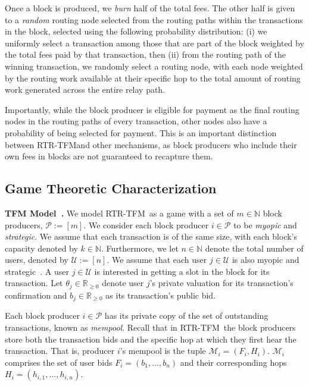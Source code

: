 \documentclass[sigconf,anonymous]{aamas}
\newcommand{\ourTFM}{\textsc{RTR-TFM}}
\renewcommand{\paragraph}[1]{\smallskip\noindent\textbf{#1}}
\begin{document}
Once a block is produced, we \emph{burn} half of the total fees. The other half is given to a \emph{random} routing node selected from the routing paths within the transactions in the block, selected using the following probability distribution: (i) we uniformly select a transaction among those that are part of the block weighted by the total fees paid by that transaction, then (ii) from the routing path of the winning transaction, we randomly select a routing node, with each node weighted by the routing work available at their specific hop to the total amount of routing work generated across the entire relay path.

Importantly, while the block producer is eligible for payment as the final routing nodes in the routing paths of every transaction, other nodes also have a probability of being selected for payment. This is an important distinction between \ourTFM and other mechanisms, as block producers who include their own fees in blocks are not guaranteed to recapture them.

\subsection{Game Theoretic Characterization}

\paragraph{TFM Model~\cite{roughgarden2021,roughgarden2024transaction}.} We model \ourTFM\ as a game with a set of $m\in\mathbb{N}$ block producers, $\mathcal{P}:=[m]$. We consider each block producer $i\in \mathcal{P}$ to be \emph{myopic} and \emph{strategic}. We assume that each transaction is of the same size, with each block's capacity denoted by $k \in \mathbb{N}$. Furthermore, we let $n\in\mathbb{N}$ denote the total number of users, denoted by $\mathcal{U}:=[n]$. We assume that each user $j\in\mathcal{U}$ is also myopic and strategic~\cite{roughgarden2021,ferreira2021dynamic,chung2023foundations,gafni2024barriers,damle2024designing}. A user $j\in\mathcal{U}$ is interested in getting a slot in the block for its transaction. Let $\theta_{j}\in \mathbb{R}_{\geq 0}$ denote user $j$'s private valuation for its transaction's confirmation and $b_j \in \mathbb{R}_{\geq 0}$ as its transaction's public bid.

Each block producer $i\in \mathcal{P}$ has its private copy of the set of outstanding transactions, known as \emph{mempool}. Recall that in \ourTFM\ the block producers store both the transaction bids and the specific hop at which they first hear the transaction. That is, producer $i$'s mempool is the tuple $\mathcal{M}_i=({F}_i, {H}_i)$. $\mathcal{M}_i$ comprises the set of user bids $F_i = (b_1,\ldots, b_{n})$ and their corresponding hops $H_i = (h_{i,1},\ldots, h_{i,n})$.
\end{document}
